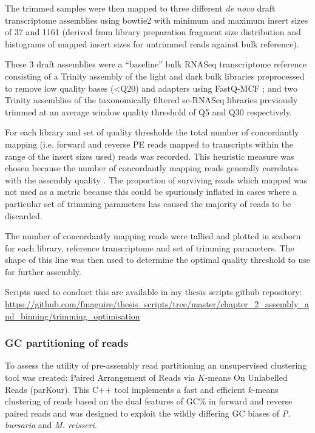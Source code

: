 The trimmed samples were then mapped to three different \textit{de novo} draft transcriptome assemblies using bowtie2
\citep{Langmead2012} with minimum and maximum insert sizes of \SI{37}{\bp} and \SI{1161}{\bp} (derived from library preparation
fragment size distribution and histograms of mapped insert sizes for untrimmed reads against bulk reference).

These 3 draft assemblies were a ``baseline'' bulk RNASeq transcriptome reference consisting of a Trinity \citep{Haas2013} 
assembly of the light and dark bulk libraries preprocessed to remove low quality bases (<Q20) and adapters using FastQ-MCF \citep{Aronesty2013};
and two Trinity assemblies of the taxonomically filtered sc-RNASeq libraries previously trimmed 
at an average window quality threshold of Q5 and Q30 respectively.


For each library and set of quality thresholds the total number of concordantly
mapping (i.e. forward and reverse PE reads mapped to transcripts within the range of the insert sizes used)
reads was recorded.  This heuristic measure was chosen because the number of concordantly mapping reads generally correlates
with the assembly quality \citep{Macmanes2014}. The proportion of surviving reads which mapped 
was not used as a metric because this could be spuriously inflated in cases where a particular
set of trimming parameters has caused the majority of reads to be discarded.

The number of concordantly mapping reads were tallied and plotted in seaborn 
for each library, reference transcriptome and set of trimming parameters.
The shape of this line was then used to determine the optimal quality 
threshold to use for further assembly.

Scripts used to conduct this are available in my thesis scripts github repository:
\url{https://github.com/fmaguire/thesis_scripts/tree/master/chapter_2_assembly_and_binning/trimming_optimisation}

\subsubsection{GC partitioning of reads}

To assess the utility of pre-assembly read partitioning an unsupervised clustering tool was created:
Paired Arrangement of Reads via \(K\)-means On Unlabelled Reads (parKour).
This C++ tool implements a fast and efficient \(k\)-means clustering of reads based on the dual features
of GC\% in forward and reverse paired reads and was designed to exploit the wildly differing GC
biases of \textit{P. bursaria} and \textit{M. reisseri}.

